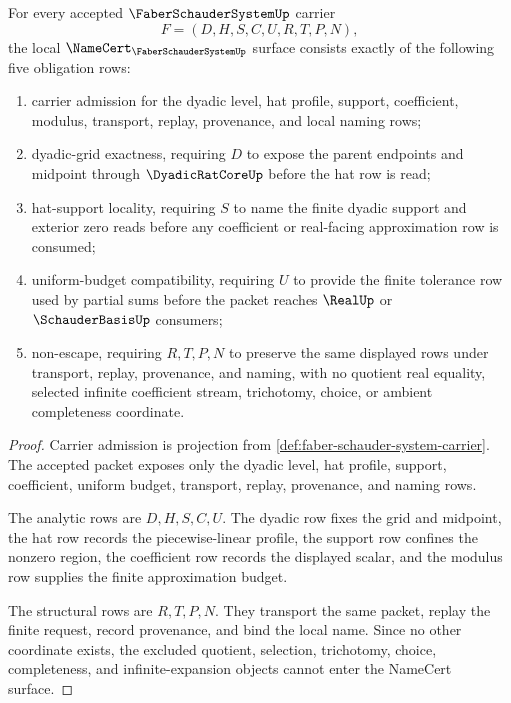 \begin{theorem}
\label{thm:faber-schauder-system-namecert-obligations}
For every accepted $\FaberSchauderSystemUp$ carrier
$$
F=(D,H,S,C,U,R,T,P,N),
$$
the local $\NameCert_{\FaberSchauderSystemUp}$ surface consists exactly of the following five obligation rows:
\begin{enumerate}
\item carrier admission for the dyadic level, hat profile, support, coefficient, modulus, transport, replay, provenance, and local naming rows;
\item dyadic-grid exactness, requiring $D$ to expose the parent endpoints and midpoint through $\DyadicRatCoreUp$ before the hat row is read;
\item hat-support locality, requiring $S$ to name the finite dyadic support and exterior zero reads before any coefficient or real-facing approximation row is consumed;
\item uniform-budget compatibility, requiring $U$ to provide the finite tolerance row used by partial sums before the packet reaches $\RealUp$ or $\SchauderBasisUp$ consumers;
\item non-escape, requiring $R,T,P,N$ to preserve the same displayed rows under transport, replay, provenance, and naming, with no quotient real equality, selected infinite coefficient stream, trichotomy, choice, or ambient completeness coordinate.
\end{enumerate}
\end{theorem}
\begin{proof}
Carrier admission is projection from \autoref{def:faber-schauder-system-carrier}. The accepted packet exposes only the dyadic level, hat profile, support, coefficient, uniform budget, transport, replay, provenance, and naming rows.

The analytic rows are $D,H,S,C,U$. The dyadic row fixes the grid and midpoint, the hat row records the piecewise-linear profile, the support row confines the nonzero region, the coefficient row records the displayed scalar, and the modulus row supplies the finite approximation budget.

The structural rows are $R,T,P,N$. They transport the same packet, replay the finite request, record provenance, and bind the local name. Since no other coordinate exists, the excluded quotient, selection, trichotomy, choice, completeness, and infinite-expansion objects cannot enter the NameCert surface.
\end{proof}

